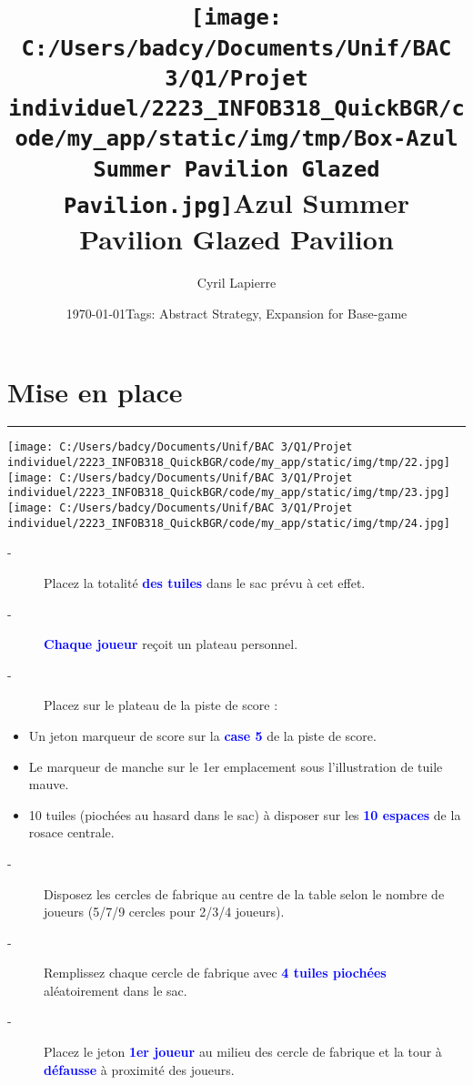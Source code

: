 \documentclass{scrartcl}%
\title{\texttt{[image: C:/Users/badcy/Documents/Unif/BAC 3/Q1/Projet individuel/2223\_INFOB318\_QuickBGR/code/my\_app/static/img/tmp/Box-Azul Summer Pavilion Glazed Pavilion.jpg]}\break Azul Summer Pavilion Glazed Pavilion }%
\author{Cyril Lapierre}%
\date{\today \break Tags: Abstract Strategy, Expansion for Base-game}%
\begin{document}
%
\normalsize%
\maketitle\thispagestyle{header}%
\pagestyle{header}%
\sectionfont{\color{blue}}%
\subsectionfont{\color{blue}}%
\subsubsectionfont{\color{blue}}%
\section{ Mise en place
}%
\label{sec:Miseenplace}%
\textcolor{blue}{\rule{18cm}{0.07cm}}\break%
%
\texttt{[image: C:/Users/badcy/Documents/Unif/BAC 3/Q1/Projet individuel/2223\_INFOB318\_QuickBGR/code/my\_app/static/img/tmp/22.jpg]}%
%
\texttt{[image: C:/Users/badcy/Documents/Unif/BAC 3/Q1/Projet individuel/2223\_INFOB318\_QuickBGR/code/my\_app/static/img/tmp/23.jpg]}%
%
\texttt{[image: C:/Users/badcy/Documents/Unif/BAC 3/Q1/Projet individuel/2223\_INFOB318\_QuickBGR/code/my\_app/static/img/tmp/24.jpg]}%

%
\begin{description}%
\item[{-} ]%
%
 Placez la totalité %
\textcolor{blue}{%
\textbf{des tuiles}%
}%
\textit{ }%
 dans le sac prévu à cet effet.
%
\item[{-} ]%
%
\textcolor{blue}{%
\textbf{Chaque joueur}%
}%
\textit{ }%
 reçoit un plateau personnel.
%
\item[{-} ]%
%
 Placez sur le plateau de la piste de score :
%
\end{description}%
\begin{itemize}%
\item%
%
 Un jeton marqueur de score sur la %
\textcolor{blue}{%
\textbf{case 5}%
}%
\textit{ }%
 de la piste de score.
%
\item%
%
 Le marqueur de manche sur le 1er emplacement sous l’illustration de tuile mauve.
%
\item%
%
 10 tuiles (piochées au hasard dans le sac) à disposer sur les %
\textcolor{blue}{%
\textbf{10 espaces}%
}%
\textit{ }%
 de la rosace centrale.
%
\end{itemize}%
\begin{description}%
\item[{-} ]%
%
 Disposez les cercles de fabrique au centre de la table selon le nombre de joueurs (5/7/9 cercles pour 2/3/4 joueurs).
%
\item[{-} ]%
%
 Remplissez chaque cercle de fabrique avec %
\textcolor{blue}{%
\textbf{4 tuiles piochées}%
}%
\textit{ }%
 aléatoirement dans le sac.
%
\item[{-} ]%
%
 Placez le jeton %
\textcolor{blue}{%
\textbf{1er joueur}%
}%
\textit{ }%
 au milieu des cercle de fabrique et la tour à %
\textcolor{blue}{%
\textbf{défausse}%
}%
\textit{ }%
 à proximité des joueurs.
%
\end{description}
\end{document}
